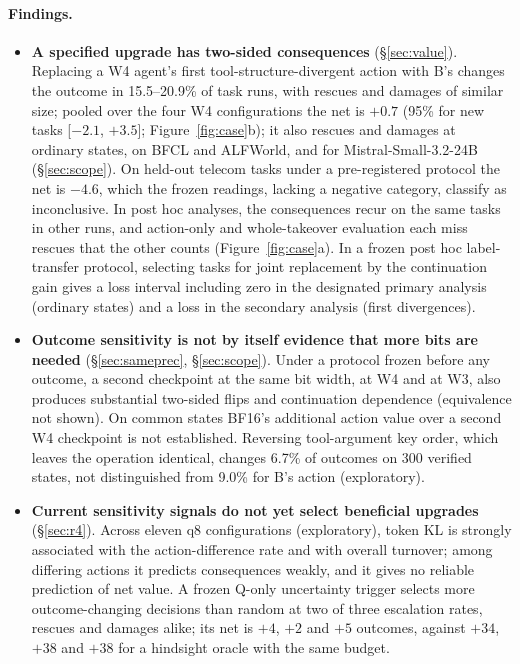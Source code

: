 \paragraph{Findings.}
\begin{itemize}[leftmargin=*,itemsep=1pt,topsep=2pt]
\item \textbf{A specified upgrade has two-sided consequences} (\S\ref{sec:value}). Replacing a W4 agent's first tool-structure-divergent action with B's changes the outcome in 15.5--20.9\% of task runs, with rescues and damages of similar size; pooled over the four W4 configurations the net is $+0.7$\pp{} (95\% for new tasks [$-2.1$, $+3.5$]; Figure~\ref{fig:case}b); it also rescues and damages at ordinary states, on BFCL and ALFWorld, and for Mistral-Small-3.2-24B (\S\ref{sec:scope}). On held-out telecom tasks under a pre-registered protocol the net is $-4.6$\pp{}, which the frozen readings, lacking a negative category, classify as inconclusive. In post hoc analyses, the consequences recur on the same tasks in other runs, and action-only and whole-takeover evaluation each miss rescues that the other counts (Figure~\ref{fig:case}a). In a frozen post hoc label-transfer protocol, selecting tasks for joint replacement by the continuation gain gives a loss interval including zero in the designated primary analysis (ordinary states) and a loss in the secondary analysis (first divergences). %
\item \textbf{Outcome sensitivity is not by itself evidence that more bits are needed} (\S\ref{sec:sameprec}, \S\ref{sec:scope}). Under a protocol frozen before any outcome, a second checkpoint at the same bit width, at W4 and at W3, also produces substantial two-sided flips and continuation dependence (equivalence not shown). On common states BF16's additional action value over a second W4 checkpoint is not established. Reversing tool-argument key order, which leaves the operation identical, changes 6.7\% of outcomes on 300 verified states, not distinguished from 9.0\% for B's action (exploratory). %
\item \textbf{Current sensitivity signals do not yet select beneficial upgrades} (\S\ref{sec:r4}). Across eleven q8 configurations (exploratory), token KL is strongly associated with the action-difference rate and with overall turnover; among differing actions it predicts consequences weakly, and it gives no reliable prediction of net value. A frozen Q-only uncertainty trigger selects more outcome-changing decisions than random at two of three escalation rates, rescues and damages alike; its net is $+4$, $+2$ and $+5$ outcomes, against $+34$, $+38$ and $+38$ for a hindsight oracle with the same budget. %
\end{itemize}

